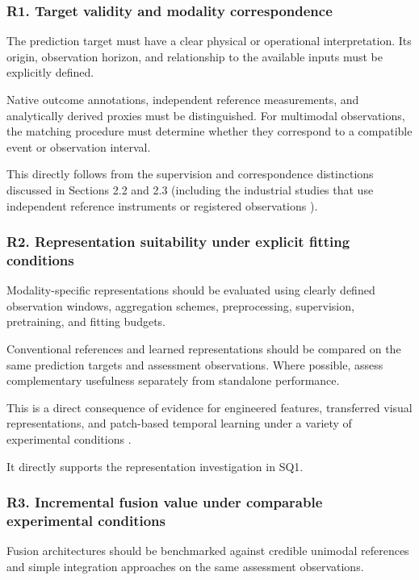 \subsubsection*{R1. Target validity and modality correspondence}

The prediction target must have a clear physical or operational interpretation. Its origin,
observation horizon, and relationship to the available inputs must be explicitly defined.

Native outcome annotations, independent reference measurements, and analytically derived proxies
must be distinguished. For multimodal observations, the matching procedure must determine whether
they correspond to a compatible event or observation interval.

This directly follows from the supervision and correspondence distinctions discussed in Sections 2.2
and 2.3 (including the industrial studies that use independent reference instruments or registered
observations \parencite{Petrich2021Multimodal,Pandiyan2022Deep,Chen2023Multisensor}).

\subsubsection*{R2. Representation suitability under explicit fitting conditions}

Modality-specific representations should be evaluated using clearly defined observation windows,
aggregation schemes, preprocessing, supervision, pretraining, and fitting budgets.

Conventional references and learned representations should be compared on the same prediction
targets and assessment observations. Where possible, assess complementary usefulness separately from
standalone performance.

This is a direct consequence of evidence for engineered features, transferred visual
representations, and patch-based temporal learning under a variety of experimental conditions
\parencite{Horwitz2023Back,Roth2022Towards,Nie2023PatchTST}.

It directly supports the representation investigation in SQ1.

\subsubsection*{R3. Incremental fusion value under comparable experimental conditions}

Fusion architectures should be benchmarked against credible unimodal references and simple
integration approaches on the same assessment observations.

